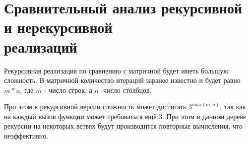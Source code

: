 \FloatBarrier

\section{Сравнительный анализ рекурсивной и нерекурсивной\\ реализаций}

Рекурсивная реализация по сравнению с матричной будет иметь большую сложность.
В матричной количество итераций заранее известно и будет равно
$m * n$, где $m$ - число строк, а $n$ -число столбцов.

При этом в рекурсивной версии сложность может достигать $3^{max(m, n)}$, так как
на каждый вызов функции может требоваться ещё 3. При этом в данном дереве рекурсии
на некоторых ветвях будут производится повторные вычисления, что неэффективно.

